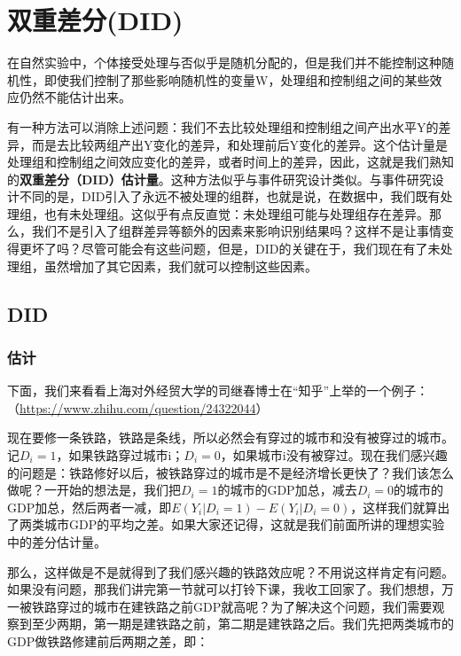 \documentclass[cn,12pt,math=newtx,citestyle=gb7714-2015,bibstyle=gb7714-2015]{elegantbook}
\begin{document}
	
	

	
	
	
	
	
	\chapter{双重差分(DID)}
	
	在自然实验中，个体接受处理与否似乎是随机分配的，但是我们并不能控制这种随机性，即使我们控制了那些影响随机性的变量W，处理组和控制组之间的某些效应仍然不能估计出来。
	
	有一种方法可以消除上述问题：我们不去比较处理组和控制组之间产出水平Y的差异，而是去比较两组产出Y变化的差异，和处理前后Y变化的差异。这个估计量是处理组和控制组之间效应变化的差异，或者时间上的差异，因此，这就是我们熟知的\textbf{双重差分（DID）估计量}。这种方法似乎与事件研究设计类似。与事件研究设计不同的是，DID引入了永远不被处理的组群，也就是说，在数据中，我们既有处理组，也有未处理组。这似乎有点反直觉：未处理组可能与处理组存在差异。那么，我们不是引入了组群差异等额外的因素来影响识别结果吗？这样不是让事情变得更坏了吗？尽管可能会有这些问题，但是，DID的关键在于，我们现在有了未处理组，虽然增加了其它因素，我们就可以控制这些因素。
	
	\section{DID}
	\subsection{估计}
	
	下面，我们来看看上海对外经贸大学的司继春博士在“知乎”上举的一个例子：（\url{https://www.zhihu.com/question/24322044}）
	
	现在要修一条铁路，铁路是条线，所以必然会有穿过的城市和没有被穿过的城市。记$D_i=1$，如果铁路穿过城市i；$D_i=0$，如果城市i没有被穿过。现在我们感兴趣的问题是：铁路修好以后，被铁路穿过的城市是不是经济增长更快了？我们该怎么做呢？一开始的想法是，我们把$D_i=1$的城市的GDP加总，减去$D_i=0$的城市的GDP加总，然后两者一减，即$E(Y_i\big|D_i=1)-E(Y_i\big|D_i=0)$，这样我们就算出了两类城市GDP的平均之差。如果大家还记得，这就是我们前面所讲的理想实验中的差分估计量。
	
	那么，这样做是不是就得到了我们感兴趣的铁路效应呢？不用说这样肯定有问题。如果没有问题，那我们讲完第一节就可以打铃下课，我收工回家了。我们想想，万一被铁路穿过的城市在建铁路之前GDP就高呢？为了解决这个问题，我们需要观察到至少两期，第一期是建铁路之前，第二期是建铁路之后。我们先把两类城市的GDP做铁路修建前后两期之差，即：
	
\end{document}
